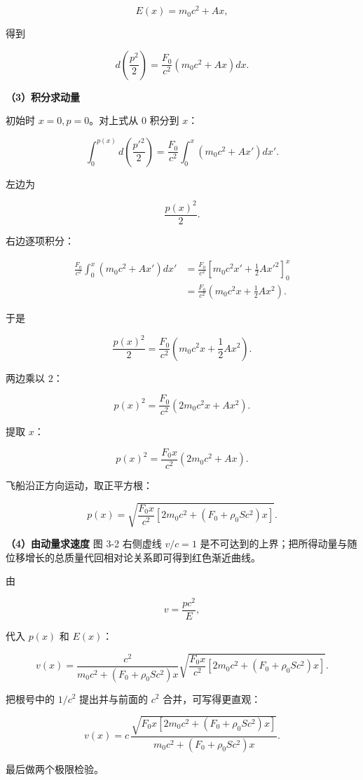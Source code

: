 \documentclass[12pt,a4paper,UTF8]{ctexart}
\begin{document}
\[E(x)=m_0c^2+Ax,\]

得到

\[d\left(\frac{p^2}{2}\right)
=\frac{F_0}{c^2}
\left(m_0c^2+Ax\right)dx.\]

\textbf{（3）积分求动量}

初始时 \(x=0,p=0\)。对上式从 \(0\) 积分到 \(x\)：

\[\int_0^{p(x)}
d\left(\frac{p'^2}{2}\right)
=\frac{F_0}{c^2}
\int_0^x\left(m_0c^2+Ax'\right)dx'.\]

左边为

\[\frac{p(x)^2}{2}.\]

右边逐项积分：

\[\begin{aligned}
\frac{F_0}{c^2}
\int_0^x\left(m_0c^2+Ax'\right)dx'
&=\frac{F_0}{c^2}
\left[
m_0c^2x'+\frac12Ax'^2
\right]_0^x\\
&=\frac{F_0}{c^2}
\left(m_0c^2x+\frac12Ax^2\right).
\end{aligned}\]

于是

\[\frac{p(x)^2}{2}
=\frac{F_0}{c^2}
\left(m_0c^2x+\frac12Ax^2\right).\]

两边乘以 \(2\)：

\[p(x)^2
=\frac{F_0}{c^2}
\left(2m_0c^2x+Ax^2\right).\]

提取 \(x\)：

\[p(x)^2
=\frac{F_0x}{c^2}
\left(2m_0c^2+Ax\right).\]

飞船沿正方向运动，取正平方根：

\[\boxed{
p(x)=
\sqrt{
\frac{F_0x}{c^2}
\left[
2m_0c^2+\left(F_0+\rho_0Sc^2\right)x
\right]
}
}.\]

\textbf{（4）由动量求速度} 图 3-2 右侧虚线 \(v/c=1\)
是不可达到的上界；把所得动量与随位移增长的总质量代回相对论关系即可得到红色渐近曲线。

由

\[v=\frac{pc^2}{E},\]

代入 \(p(x)\) 和 \(E(x)\)：

\[v(x)=
\frac{c^2}{
m_0c^2+\left(F_0+\rho_0Sc^2\right)x
}
\sqrt{
\frac{F_0x}{c^2}
\left[
2m_0c^2+\left(F_0+\rho_0Sc^2\right)x
\right]
}.\]

把根号中的 \(1/c^2\) 提出并与前面的 \(c^2\) 合并，可写得更直观：

\[\boxed{
v(x)=
c\,
\frac{
\sqrt{
F_0x\left[
2m_0c^2+\left(F_0+\rho_0Sc^2\right)x
\right]
}
}{
m_0c^2+\left(F_0+\rho_0Sc^2\right)x
}
}.\]

最后做两个极限检验。
\end{document}
